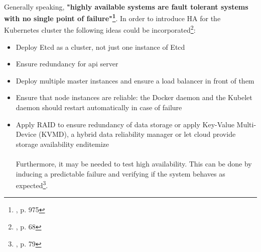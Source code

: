 \paragraph{}
Generally speaking, \textbf{"highly available systems are fault tolerant systems with no single point of failure"\footnote{\cite{article-redundancy-models}, p. 975}}. In order to introduce HA for the Kubernetes cluster the following ideas could be incorporated\footnote{\cite{book-mastering-k8s}, p. 68}:
\begin{itemize}
\item Deploy Etcd as a cluster, not just one instance of Etcd
\item Ensure redundancy for api server
\item Deploy multiple master instances and ensure a load balancer in front of them
\item Ensure that node instances are reliable: the Docker daemon and the Kubelet daemon should restart automatically in case of failure
\item Apply RAID to ensure redundancy of data storage or apply Key-Value Multi-Device (KVMD), a hybrid data reliability manager\cite{data-rel-kv} or let cloud provide storage availability
end{itemize}

\paragraph{}
Furthermore, it may be needed to test high availability. This can be done by inducing a predictable failure and verifying if the system behaves as expected\footnote{\cite{book-mastering-k8s}, p. 79}.


\end{itemize}
